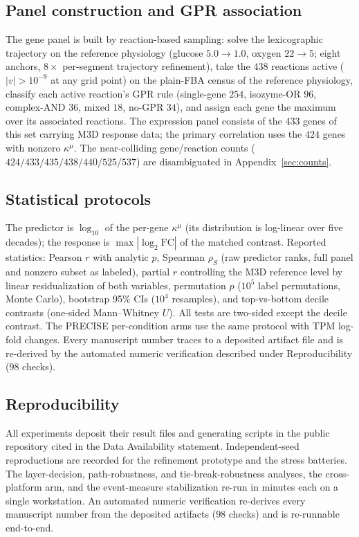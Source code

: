 \documentclass[11pt,a4paper]{article}
\theoremstyle{plain}
\theoremstyle{definition}
\theoremstyle{remark}
\newcommand{\kmu}{\kappa^{\mu}}
\begin{document}
\subsection{Panel construction and GPR association}

The gene panel is built by reaction-based sampling: solve the lexicographic trajectory on the reference physiology (glucose $5.0 \to
1.0$, oxygen $22 \to 5$; eight anchors, $8\times$ per-segment
trajectory refinement), take the $438$ reactions active
($|v| > 10^{-9}$ at any grid point) on the plain-FBA census of the
reference physiology,
classify each active reaction's GPR rule (single-gene $254$,
isozyme-OR $96$, complex-AND $36$, mixed $18$, no-GPR $34$), and
assign each gene the maximum over its associated reactions. The expression panel consists of the $433$ genes of this set carrying M3D response
data; the primary correlation uses the $424$ genes with nonzero
$\kmu$. The near-colliding gene/reaction counts
($424/433/435/438/440/525/537$) are disambiguated in Appendix~\ref{sec:counts}.

\subsection{Statistical protocols}

The predictor is $\log_{10}$ of the per-gene $\kmu$ (its
distribution is log-linear over five decades); the response is
$\max|\log_2 \mathrm{FC}|$ of the matched contrast. Reported
statistics: Pearson $r$ with analytic $p$, Spearman $\rho_S$
(raw predictor ranks, full panel and nonzero subset as labeled),
partial $r$ controlling the M3D reference level by linear
residualization of both variables, permutation $p$ ($10^5$
label permutations, Monte Carlo), bootstrap 95\% CIs ($10^4$
resamples), and top-vs-bottom decile contrasts (one-sided
Mann--Whitney $U$). All tests are two-sided except the decile
contrast. The PRECISE per-condition arms use the same protocol
with TPM log-fold changes. Every manuscript number traces to a deposited artifact file and is re-derived by the automated numeric verification described under Reproducibility ($98$ checks).

\subsection{Reproducibility}

All experiments deposit their result files and generating
scripts in the public repository cited in the Data Availability
statement. Independent-seed reproductions are recorded for the
refinement prototype and the stress batteries. The layer-decision,
path-robustness, and tie-break-robustness analyses, the cross-platform
arm, and the event-measure stabilization re-run in minutes each on a
single workstation. An automated numeric verification re-derives every
manuscript number from the deposited artifacts ($98$ checks) and is
re-runnable end-to-end.
\end{document}
